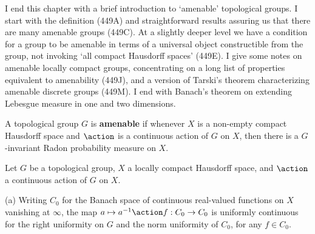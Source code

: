 
\def\chaptername{Topological groups}
\def\sectionname{Amenable groups}

\def\length{\mathop{\text{length}}\nolimits}
\def\BbbZ{\mathchoice{\hbox{$\Bbb Z$\hskip0.02em}}
  {\hbox{$\Bbb Z$\hskip0.02em}}
  {\hbox{$\scriptstyle\Bbb Z$\hskip0.04em}}
  {\hbox{$\scriptscriptstyle\Bbb Z$\hskip0.04em}}}
\def\trs{^{\top}}


I end this chapter with a brief introduction to `amenable' topological
groups.   I start with the
definition (449A) and straightforward results assuring us that there
are many amenable groups (449C).   At a slightly deeper level we have a
condition for a group to be amenable in terms of a universal object
constructible from the group, not invoking `all compact Hausdorff
spaces' (449E).   I give some notes on amenable locally compact
groups, concentrating on a long list of properties equivalent to
amenability (449J), and a version of Tarski's theorem characterizing
amenable discrete groups (449M).   I end with Banach's theorem on extending
Lebesgue measure in one and two dimensions.

 A topological group $G$ is {\bf amenable} if
whenever $X$ is a non-empty compact Hausdorff space and $\action$ is a
continuous action of $G$ on $X$, then there is a $G$-invariant
Radon probability measure on $X$.


 Let $G$ be a topological group, $X$ a locally
compact Hausdorff space, and $\action$ a continuous action of $G$ on
$X$.

(a) Writing $C_0$ for the Banach space of continuous real-valued
functions on $X$ vanishing at $\infty$, the map
$a\mapsto a^{-1}\action f:C_0\to C_0$
is uniformly continuous for the right uniformity on $G$ and the norm
uniformity of $C_0$, for any $f\in C_0$.

